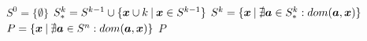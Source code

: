 \begin{algorithmic}[1] %
    \State $S^0 = \big\{\emptyset\big\}$
      \State $S_*^k = S^{k-1} \cup \{\boldsymbol{x} \cup k \:|\: \boldsymbol{x} \in S^{k-1}\}$
      \State $S^k = \{\boldsymbol{x} \:|\: \nexists \boldsymbol{a} \in S_*^k: dom(\boldsymbol{a}, \boldsymbol{x}) \}$
    \EndFor
  \State $P = \{\boldsymbol{x} \:|\: \nexists \boldsymbol{a} \in S^n: dom(\boldsymbol{a}, \boldsymbol{x}) \}$
  \State \Return $P$
  \EndFunction
\end{algorithmic}
